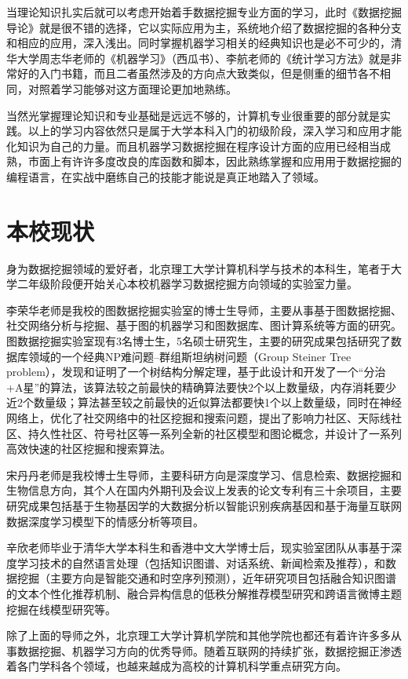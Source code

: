 \documentclass{misc/elegantpaper}
\begin{document}
当理论知识扎实后就可以考虑开始着手数据挖掘专业方面的学习，此时《数据挖掘导论》就是很不错的选择，它以实际应用为主，系统地介绍了数据挖掘的各种分支和相应的应用，深入浅出。同时掌握机器学习相关的经典知识也是必不可少的，清华大学周志华老师的《机器学习》（西瓜书）、李航老师的《统计学习方法》就是非常好的入门书籍，而且二者虽然涉及的方向点大致类似，但是侧重的细节各不相同，对照着学习能够对这方面理论更加地熟练。

当然光掌握理论知识和专业基础是远远不够的，计算机专业很重要的部分就是实践。以上的学习内容依然只是属于大学本科入门的初级阶段，深入学习和应用才能化知识为自己的力量。而且机器学习数据挖掘在程序设计方面的应用已经相当成熟，市面上有许许多度改良的库函数和脚本，因此熟练掌握和应用用于数据挖掘的编程语言，在实战中磨练自己的技能才能说是真正地踏入了领域。

\section{本校现状}

身为数据挖掘领域的爱好者，北京理工大学计算机科学与技术的本科生，笔者于大学二年级阶段便开始关心本校机器学习数据挖掘方向领域的实验室力量。

李荣华老师是我校的图数据挖掘实验室的博士生导师，主要从事基于图数据挖掘、社交网络分析与挖掘、基于图的机器学习和图数据库、图计算系统等方面的研究。图数据挖掘实验室现有3名博士生，5名硕士研究生，主要的研究成果包括研究了数据库领域的一个经典NP难问题--群组斯坦纳树问题（Group Steiner Tree problem），发现和证明了一个树结构分解定理，基于此设计和开发了一个“分治+A星”的算法，该算法较之前最快的精确算法要快2个以上数量级，内存消耗要少近2个数量级；算法甚至较之前最快的近似算法都要快1个以上数量级，同时在神经网络上，优化了社交网络中的社区挖掘和搜索问题，提出了影响力社区、天际线社区、持久性社区、符号社区等一系列全新的社区模型和图论概念，并设计了一系列高效快速的社区挖掘和搜索算法。

宋丹丹老师是我校博士生导师，主要科研方向是深度学习、信息检索、数据挖掘和生物信息方向，其个人在国内外期刊及会议上发表的论文专利有三十余项目，主要研究成果包括基于生物基因学的大数据分析以智能识别疾病基因和基于海量互联网数据深度学习模型下的情感分析等项目。

辛欣老师毕业于清华大学本科生和香港中文大学博士后，现实验室团队从事基于深度学习技术的自然语言处理（包括知识图谱、对话系统、新闻检索及推荐），和数据挖掘（主要方向是智能交通和时空序列预测），近年研究项目包括融合知识图谱的文本个性化推荐机制、融合异构信息的低秩分解推荐模型研究和跨语言微博主题挖掘在线模型研究等。

除了上面的导师之外，北京理工大学计算机学院和其他学院也都还有着许许多多从事数据挖掘、机器学习方向的优秀导师。随着互联网的持续扩张，数据挖掘正渗透着各门学科各个领域，也越来越成为高校的计算机科学重点研究方向。
\end{document}
